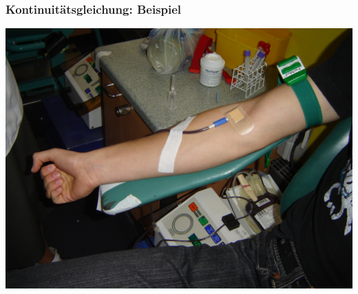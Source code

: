 \documentclass{beamer}
\begin{document}

\begin{frame}
\end{frame}


\begin{frame}
\frametitle{Kontinuitätsgleichung: Beispiel}
\begin{center}
\includegraphics[width=\textwidth]{blutspende.JPG}
\end{center}
\end{frame}

\end{document}

